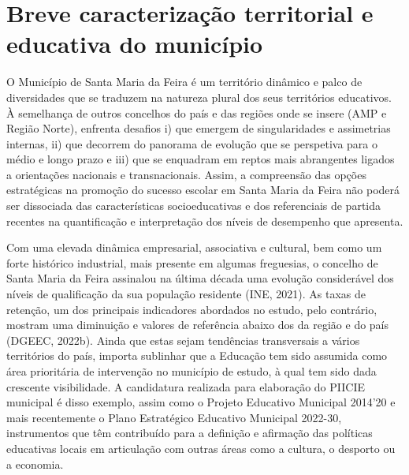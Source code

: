 \documentclass[
]{book}
\begin{document}
\hypertarget{breve-caracterizauxe7uxe3o-territorial-e-educativa-do-municuxedpio}{%
\section{\texorpdfstring{\textbf{Breve caracterização territorial e educativa do município}}{Breve caracterização territorial e educativa do município}}\label{breve-caracterizauxe7uxe3o-territorial-e-educativa-do-municuxedpio}}

O Município de Santa Maria da Feira é um território dinâmico e palco de diversidades que se traduzem na natureza plural dos seus territórios educativos. À semelhança de outros concelhos do país e das regiões onde se insere (AMP e Região Norte), enfrenta desafios i) que emergem de singularidades e assimetrias internas, ii) que decorrem do panorama de evolução que se perspetiva para o médio e longo prazo e iii) que se enquadram em reptos mais abrangentes ligados a orientações nacionais e transnacionais. Assim, a compreensão das opções estratégicas na promoção do sucesso escolar em Santa Maria da Feira não poderá ser dissociada das características socioeducativas e dos referenciais de partida recentes na quantificação e interpretação dos níveis de desempenho que apresenta.

Com uma elevada dinâmica empresarial, associativa e cultural, bem como um forte histórico industrial, mais presente em algumas freguesias, o concelho de Santa Maria da Feira assinalou na última década uma evolução considerável dos níveis de qualificação da sua população residente (INE, 2021). As taxas de retenção, um dos principais indicadores abordados no estudo, pelo contrário, mostram uma diminuição e valores de referência abaixo dos da região e do país (DGEEC, 2022b). Ainda que estas sejam tendências transversais a vários territórios do país, importa sublinhar que a Educação tem sido assumida como área prioritária de intervenção no município de estudo, à qual tem sido dada crescente visibilidade. A candidatura realizada para elaboração do PIICIE municipal é disso exemplo, assim como o Projeto Educativo Municipal 2014'20 e mais recentemente o Plano Estratégico Educativo Municipal 2022-30, instrumentos que têm contribuído para a definição e afirmação das políticas educativas locais em articulação com outras áreas como a cultura, o desporto ou a economia.
\end{document}
